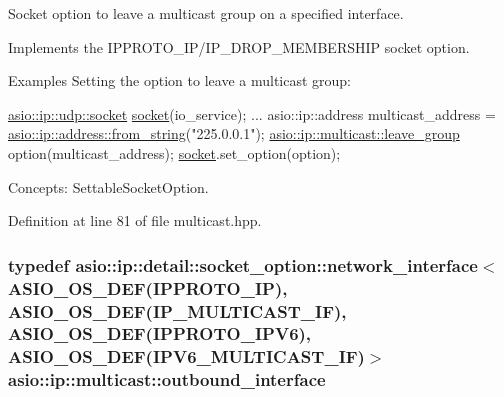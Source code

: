 Socket option to leave a multicast group on a specified interface. 

Implements the I\+P\+P\+R\+O\+T\+O\+\_\+\+I\+P/\+I\+P\+\_\+\+D\+R\+O\+P\+\_\+\+M\+E\+M\+B\+E\+R\+S\+H\+I\+P socket option.

\begin{DoxyParagraph}{Examples}
Setting the option to leave a multicast group\+: 
\begin{DoxyCode}
\hyperlink{classasio_1_1basic__datagram__socket}{asio::ip::udp::socket} \hyperlink{namespacewebsocketpp_1_1transport_1_1asio_1_1socket_1_1error_a828ddaa5ed63a761e1b557465a35f05aa0c31b356014843e1d09514e794a539a7}{socket}(io\_service); 
...
asio::ip::address multicast\_address =
  \hyperlink{classasio_1_1ip_1_1address_a243a3c877143eff5cdf97a6b021febec}{asio::ip::address::from\_string}(\textcolor{stringliteral}{"225.0.0.1"});
\hyperlink{classasio_1_1ip_1_1detail_1_1socket__option_1_1multicast__request}{asio::ip::multicast::leave\_group} option(multicast\_address);
\hyperlink{namespacewebsocketpp_1_1transport_1_1asio_1_1socket_1_1error_a828ddaa5ed63a761e1b557465a35f05aa0c31b356014843e1d09514e794a539a7}{socket}.set\_option(option);
\end{DoxyCode}

\end{DoxyParagraph}
\begin{DoxyParagraph}{Concepts\+:}
Settable\+Socket\+Option. 
\end{DoxyParagraph}


Definition at line 81 of file multicast.\+hpp.

\hypertarget{namespaceasio_1_1ip_1_1multicast_a0c7f18a8d8e3922c06d0d3894754b2f5}{}
\subsubsection[{outbound\+\_\+interface}]{\setlength{\rightskip}{0pt plus 5cm}typedef {\bf asio\+::ip\+::detail\+::socket\+\_\+option\+::network\+\_\+interface}$<$ {\bf A\+S\+I\+O\+\_\+\+O\+S\+\_\+\+D\+E\+F}(I\+P\+P\+R\+O\+T\+O\+\_\+\+I\+P), {\bf A\+S\+I\+O\+\_\+\+O\+S\+\_\+\+D\+E\+F}(I\+P\+\_\+\+M\+U\+L\+T\+I\+C\+A\+S\+T\+\_\+\+I\+F), {\bf A\+S\+I\+O\+\_\+\+O\+S\+\_\+\+D\+E\+F}(I\+P\+P\+R\+O\+T\+O\+\_\+\+I\+P\+V6), {\bf A\+S\+I\+O\+\_\+\+O\+S\+\_\+\+D\+E\+F}(I\+P\+V6\+\_\+\+M\+U\+L\+T\+I\+C\+A\+S\+T\+\_\+\+I\+F)$>$ {\bf asio\+::ip\+::multicast\+::outbound\+\_\+interface}}\label{namespaceasio_1_1ip_1_1multicast_a0c7f18a8d8e3922c06d0d3894754b2f5}


